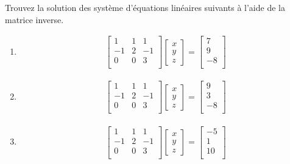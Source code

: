 \documentclass[]{book}
\providecommand{\tightlist}{%
  \setlength{\itemsep}{0pt}\setlength{\parskip}{0pt}}
\theoremstyle{definition}
\theoremstyle{definition}
\theoremstyle{definition}
\theoremstyle{remark}
\let\BeginKnitrBlock\begin \let\EndKnitrBlock\end
\begin{document}
\BeginKnitrBlock{example}
\protect\hypertarget{exm:unnamed-chunk-82}{}{\label{exm:unnamed-chunk-82} }Trouvez la solution des système d'équations linéaires suivants à l'aide de la matrice inverse.

\begin{enumerate}
\def\labelenumi{\alph{enumi}.}
\tightlist
\item
  \begin{align*}
  \begin{bmatrix}
  1&1&1\\
  -1&2&-1\\
  0&0&3\\
  \end{bmatrix}
  \begin{bmatrix}
  x \\y \\z
  \end{bmatrix}
  =
  \begin{bmatrix}
  7\\
  9\\
  -8\\
  \end{bmatrix}
  \end{align*}
\item
  \begin{align*}
  \begin{bmatrix}
  1&1&1\\
  -1&2&-1\\
  0&0&3\\
  \end{bmatrix}
  \begin{bmatrix}
  x \\y \\z
  \end{bmatrix}
  =
  \begin{bmatrix}
  9\\
  3\\
  -8\\
  \end{bmatrix}
  \end{align*}
\item
  \begin{align*}
  \begin{bmatrix}
  1&1&1\\
  -1&2&-1\\
  0&0&3\\
  \end{bmatrix}
  \begin{bmatrix}
  x \\y \\z
  \end{bmatrix}
  =
  \begin{bmatrix}
  -5\\
  1\\
  10\\
  \end{bmatrix}
  \end{align*}
\end{enumerate}
\EndKnitrBlock{example}
\end{document}
